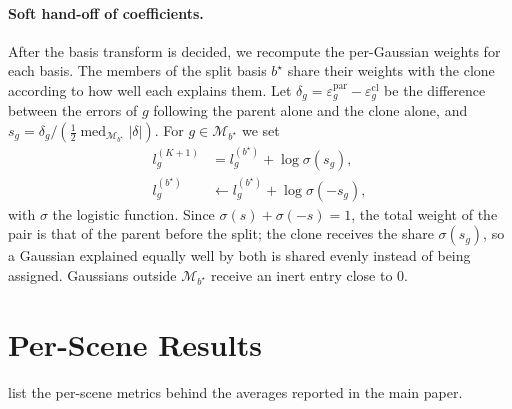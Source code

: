 \paragraph{Soft hand-off of coefficients.}
After the basis transform is decided, we recompute the per-Gaussian weights for each basis. The members of the split basis $b^\star$ share their weights with the clone according to how well each explains them. Let $\delta_g = \varepsilon^{\mathrm{par}}_g - \varepsilon^{\mathrm{cl}}_g$ be the
difference between the errors of $g$ following the parent alone and the clone alone, and
$s_g = \delta_g / (\tfrac{1}{2} \operatorname{med}_{\mathcal{M}_{b^\star}} \lvert \delta \rvert)$. For $g \in
\mathcal{M}_{b^\star}$ we set
\begin{equation}
  \begin{aligned}
  l^{(K+1)}_g &= l^{(b^\star)}_g + \log \sigma(s_g) , \\
  l^{(b^\star)}_g &\leftarrow l^{(b^\star)}_g + \log \sigma(-s_g) ,
  \end{aligned}
  \label{eq:handoff}
\end{equation}
with $\sigma$ the logistic function. Since $\sigma(s) + \sigma(-s) = 1$, the total weight of the pair is that of the
parent before the split; the clone receives the share $\sigma(s_g)$, so a Gaussian explained equally well by both is shared
evenly instead of being assigned. Gaussians outside $\mathcal{M}_{b^\star}$ receive an inert entry
close to 0.

\section{Per-Scene Results}
\label{sec:suppl-per-scene}
 list the per-scene metrics behind the averages reported in the main paper.



